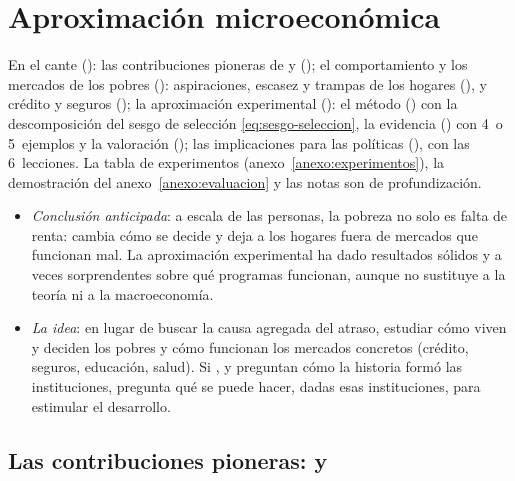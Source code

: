 \documentclass[11pt]{article}
\begin{document}
\section{Aproximación microeconómica}\label{sec:microap}

\begin{notaopositor}
En el cante (): las contribuciones pioneras de  y  (); el comportamiento y los mercados de los pobres (): aspiraciones, escasez y trampas de los hogares (), y crédito y seguros (); la aproximación experimental (): el método () con la descomposición del sesgo de selección \eqref{eq:sesgo-seleccion}, la evidencia () con 4~o 5~ejemplos y la valoración (); las implicaciones para las políticas (), con las 6~lecciones. La tabla de experimentos (anexo~\ref{anexo:experimentos}), la demostración del anexo~\ref{anexo:evaluacion} y las notas son de profundización.
\end{notaopositor}

\begin{itemize}
\item \emph{Conclusión anticipada}: a escala de las personas, la pobreza no solo es falta de renta: cambia cómo se decide y deja a los hogares fuera de mercados que funcionan mal. La aproximación experimental ha dado resultados sólidos y a veces sorprendentes sobre qué programas funcionan, aunque no sustituye a la teoría ni a la macroeconomía.
\item \emph{La idea}: en lugar de buscar la causa agregada del atraso, estudiar cómo viven y deciden los pobres y cómo funcionan los mercados concretos (crédito, seguros, educación, salud). Si ,  y  preguntan cómo la historia formó las instituciones,  pregunta qué se puede hacer, dadas esas instituciones, para estimular el desarrollo.
\end{itemize}

\subsection{Las contribuciones pioneras:  y }\label{sec:pioneras}
\end{document}
